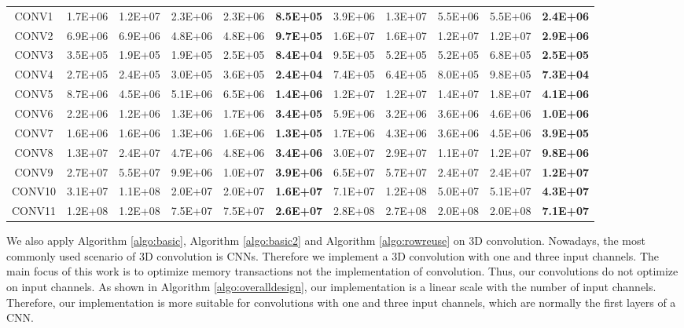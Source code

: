 \begin{table}[]
\begin{tabular}{c|ccccc|ccccc}
CONV1& 1.7E+06& 1.2E+07& 2.3E+06& 2.3E+06& \textbf{8.5E+05}& 3.9E+06& 1.3E+07& 5.5E+06& 5.5E+06& \textbf{2.4E+06}\\
CONV2& 6.9E+06& 6.9E+06& 4.8E+06& 4.8E+06& \textbf{9.7E+05}& 1.6E+07& 1.6E+07& 1.2E+07& 1.2E+07& \textbf{2.9E+06}\\
CONV3& 3.5E+05& 1.9E+05& 1.9E+05& 2.5E+05& \textbf{8.4E+04}& 9.5E+05& 5.2E+05& 5.2E+05& 6.8E+05& \textbf{2.5E+05}\\
CONV4& 2.7E+05& 2.4E+05& 3.0E+05& 3.6E+05& \textbf{2.4E+04}& 7.4E+05& 6.4E+05& 8.0E+05& 9.8E+05& \textbf{7.3E+04}\\
CONV5& 8.7E+06& 4.5E+06& 5.1E+06& 6.5E+06& \textbf{1.4E+06}& 1.2E+07& 1.2E+07& 1.4E+07& 1.8E+07& \textbf{4.1E+06}\\
CONV6& 2.2E+06& 1.2E+06& 1.3E+06& 1.7E+06& \textbf{3.4E+05}& 5.9E+06& 3.2E+06& 3.6E+06& 4.6E+06& \textbf{1.0E+06}\\
CONV7& 1.6E+06& 1.6E+06& 1.3E+06& 1.6E+06& \textbf{1.3E+05}& 1.7E+06& 4.3E+06& 3.6E+06& 4.5E+06& \textbf{3.9E+05}\\
CONV8& 1.3E+07& 2.4E+07& 4.7E+06& 4.8E+06& \textbf{3.4E+06}& 3.0E+07& 2.9E+07& 1.1E+07& 1.2E+07& \textbf{9.8E+06}\\
CONV9& 2.7E+07& 5.5E+07& 9.9E+06& 1.0E+07& \textbf{3.9E+06}& 6.5E+07& 5.7E+07& 2.4E+07& 2.4E+07& \textbf{1.2E+07}\\
CONV10& 3.1E+07& 1.1E+08& 2.0E+07& 2.0E+07& \textbf{1.6E+07}& 7.1E+07& 1.2E+08& 5.0E+07& 5.1E+07& \textbf{4.3E+07}\\
CONV11& 1.2E+08& 1.2E+08& 7.5E+07& 7.5E+07& \textbf{2.6E+07}& 2.8E+08& 2.7E+08& 2.0E+08& 2.0E+08& \textbf{7.1E+07}\\ \hline
\end{tabular}
\end{table}

We also apply Algorithm \ref{algo:basic}, Algorithm \ref{algo:basic2} and Algorithm \ref{algo:rowreuse} on 3D convolution. Nowadays, the
most commonly used scenario of 3D convolution is CNNs. Therefore we implement a 3D convolution with one and three input channels. The main
focus of this work is to optimize memory transactions not the implementation of convolution. Thus, our convolutions do not optimize on
input channels. As shown in Algorithm \ref{algo:overalldesign}, our implementation is a linear scale with the number of input channels.
Therefore, our implementation is more suitable for convolutions with one and three input channels, which are normally the first layers of a
CNN.

